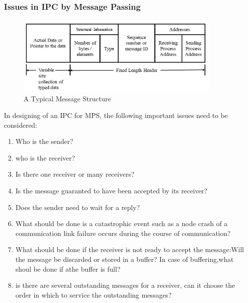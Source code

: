 \documentclass{beamer}
\begin{document}
\begin{frame}[allowframebreaks]
	\frametitle{Issues in IPC by Message Passing}
	\begin{figure}
		\centering
		\includegraphics[width=10cm]{messageStructure.jpg}
		\caption{A Typical Message Structure}
	\end{figure}
	\framebreak
	In designing of an IPC for MPS, the following important issues need to be considered:
	\begin{enumerate}
		\item Who is the sender?
		\item who is the receiver?
		\item Is there one receiver or many receivers?
		\item Is the message guaranted to have been accepted by its receiver?
		\item Does the sender need to wait for a reply?
		\item What should be done is a catastrophic event such as a node crash of a communication link failure occurs during the course of communication?
		\item What should be done if the receiver is not ready to accept the message:Will the message be discarded or stored in a buffer? In case of buffering,what shoul be done if athe buffer is full?
		\item is there are several outstanding messages for a receiver, can it choose the order in which to service the outstanding messages?
	\end{enumerate}	 
\end{frame}
\end{document}
